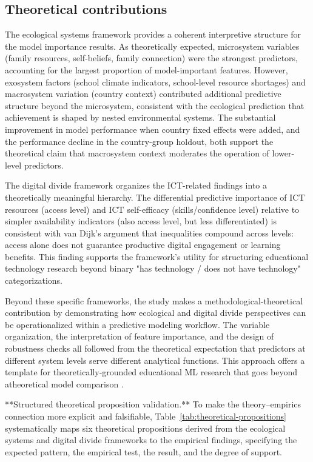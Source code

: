 \documentclass[pdflatex,sn-mathphys-ay]{sn-jnl}
\begin{document}
\FloatBarrier
\subsection{Theoretical contributions}

The ecological systems framework \citep{Bronfenbrenner_1979,Bronfenbrenner_1994} provides a coherent interpretive structure for the model importance results. As theoretically expected, microsystem variables (family resources, self-beliefs, family connection) were the strongest predictors, accounting for the largest proportion of model-important features. However, exosystem factors (school climate indicators, school-level resource shortages) and macrosystem variation (country context) contributed additional predictive structure beyond the microsystem, consistent with the ecological prediction that achievement is shaped by nested environmental systems. The substantial improvement in model performance when country fixed effects were added, and the performance decline in the country-group holdout, both support the theoretical claim that macrosystem context moderates the operation of lower-level predictors.

The digital divide framework \citep{van_Dijk_2005,van_Dijk_2020} organizes the ICT-related findings into a theoretically meaningful hierarchy. The differential predictive importance of ICT resources (access level) and ICT self-efficacy (skills/confidence level) relative to simpler availability indicators (also access level, but less differentiated) is consistent with van Dijk's argument that inequalities compound across levels: access alone does not guarantee productive digital engagement or learning benefits. This finding supports the framework's utility for structuring educational technology research beyond binary "has technology / does not have technology" categorizations.

Beyond these specific frameworks, the study makes a methodological-theoretical contribution by demonstrating how ecological and digital divide perspectives can be operationalized within a predictive modeling workflow. The variable organization, the interpretation of feature importance, and the design of robustness checks all followed from the theoretical expectation that predictors at different system levels serve different analytical functions. This approach offers a template for theoretically-grounded educational ML research that goes beyond atheoretical model comparison \citep{Ersozlu_2024}.

**Structured theoretical proposition validation.** To make the theory--empirics connection more explicit and falsifiable, Table~\ref{tab:theoretical-propositions} systematically maps six theoretical propositions derived from the ecological systems and digital divide frameworks to the empirical findings, specifying the expected pattern, the empirical test, the result, and the degree of support.
\end{document}
